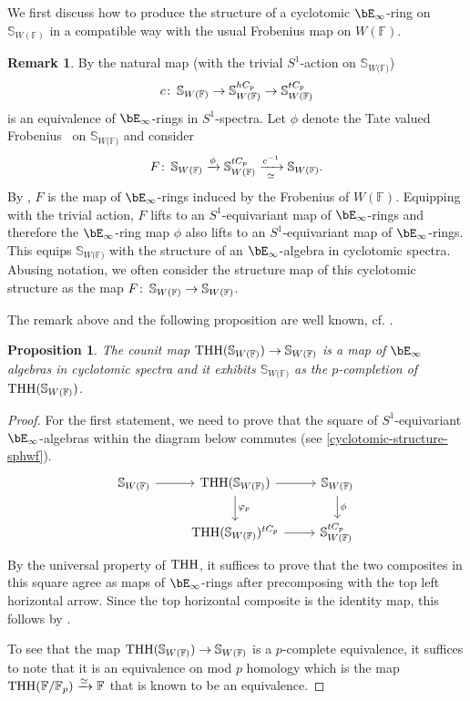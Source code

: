 \documentclass[english,10pt]{amsart}
\newcommand{\RomanNumeralCaps}[1]
    {\MakeUppercase{\romannumeral #1}}
\newcommand{\sphwf}{\mathbb{S}_{W(\mathbb{F)}}}
\newcommand{\field}{\mathbb{F}}
\newtheorem{prop}{Proposition}[section]
\theoremstyle{definition}
\newtheorem{rema}{Remark}[section]
\numberwithin{equation}{section}
\DeclareMathOperator{\thh}{\ensuremath{\textup{THH}}}
\newcommand{\THH}{\thh}
\def\co{\colon\thinspace}
\begin{document}
We first discuss how to produce the structure of a cyclotomic $\bE_\infty$-ring on $\mathbb{S}_{W(\field)}$ in a compatible way with the usual Frobenius map on $W(\field)$. 
\begin{rema}\label{cyclotomic-structure-sphwf}
By \cite[Proposition 6.6]{yuan2023integralmodels} the natural map (with the trivial $S^1$-action on $\sphwf$) 
\[c \co \sphwf \to \sphwf^{hC_p} \to \sphwf^{tC_p}
\] 
is  an equivalence of  $\bE_\infty$-rings in $S^1$-spectra. Let $\phi$ denote the Tate valued Frobenius~\cite[Definition~IV.1.1]{nikolausscholze2018topologicalcyclic} on $\sphwf$ and consider
\[F \co \sphwf \xrightarrow{\phi} \sphwf^{tC_p} \xrightarrow[\simeq]{c^{-1}} \sphwf.\]
By \cite[Example 6.14]{yuan2023integralmodels}, $F$ is the map of $\bE_\infty$-rings induced by the Frobenius of $W(\field)$. Equipping with the trivial action, $F$ lifts to an $S^1$-equivariant map of  $\bE_\infty$-rings and therefore the $\bE_\infty$-ring map   $\phi$ also lifts to an  $S^1$-equivariant map of $\bE_\infty$-rings. This equips $\sphwf$ with the structure of an $\bE_\infty$-algebra in cyclotomic spectra. Abusing notation, we often consider the structure map of this cyclotomic structure as the map $F \co \sphwf \to \sphwf$. 
\end{rema}

The remark above and the following proposition are well known, cf. \cite[Proposition 2.10]{LW22}.
\begin{prop}\label{rema spherical witts as cyclotomic base}
The counit map $\thh(\sphwf) \to \sphwf$ is a map of  $\bE_\infty$ algebras in cyclotomic spectra and it exhibits $\sphwf$ as the $p$-completion of $\thh(\sphwf)$.
\end{prop}

\begin{proof} 
For the first statement, we need to prove that the square of $S^1$-equivariant $\bE_\infty$-algebras within the diagram below commutes (see \autoref{cyclotomic-structure-sphwf}). 
\[
\begin{tikzcd}
\sphwf \arrow{r}   & \THH(\sphwf) \arrow{r} \arrow{d}{\varphi_p} & \sphwf  \arrow[d,"\phi"] \\  
 &  \THH(\sphwf)^{tC_p}  \arrow{r} & \sphwf^{tC_p}  \,
\end{tikzcd}
\]
By the universal property of $\thh$, it suffices to prove that the two composites in this square  agree as maps of $\bE_\infty$-rings  after precomposing with the top left horizontal arrow. Since the top horizontal composite is the identity map, this follows by \cite[Corollary~\RomanNumeralCaps{4}.2.4]{nikolausscholze2018topologicalcyclic}.

To see that the map $\THH(\sphwf) \rightarrow \sphwf $ is a $p$-complete equivalence, it suffices to note that it is an equivalence on mod $p$ homology which is the map $\thh(\field/\mathbb{F}_p)\xrightarrow{\simeq} \field$ that  is known to be an equivalence.
\end{proof}
\end{document}
